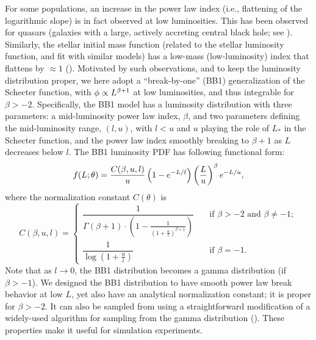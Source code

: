 For some populations, an increase in the power law index (i.e., flattening of the logarithmic slope) is in fact observed at low luminosities.
This has been observed for quasars (galaxies with a large, actively accreting central black hole; see \citealt{M+13-QuasarLumFunc}).
Similarly, the stellar initial mass function (related to the stellar luminosity function, and fit with similar models) has a low-mass (low-luminosity) index that flattens by $\approx 1$ (\citealt{K07-IMF-BPL}).
Motivated by such observations, and to keep the luminosity distribution proper, we here adopt a ``break-by-one'' (BB1) generalization of the Schecter function, with $\phi \propto L^{\beta+1}$ at low luminosities, and thus integrable for $\beta > -2$.
Specifically, the BB1 model has a luminosity distribution with three parameters: a mid-luminosity power law index, $\beta$, and two parameters defining the mid-luminosity range, $(l, u)$, with $l < u$ and  $u$ playing the role of $L_*$ in the Schecter function, and the power law index smoothly breaking to $\beta+1$ as $L$ decreases below $l$.
The BB1 luminosity PDF has following functional form:
\begin{equation}
\label{eq:lumPDF} 
f(L ; \theta) = 
  \frac{C(\beta,u,l)}{u}\left(1-e^{-L/l}\right) \left(\frac{L}{u}\right)^{\beta} e^{-L/u},
\end{equation}
where the normalization constant $C(\theta)$ is
\begin{equation}
\label{eq:normLumPDF} 
C(\beta,u,l) =
  \begin{cases} \dfrac{1}{\Gamma(\beta+1)\cdot\left(1-\frac{1}{\left(1+\frac{u}{l}\right)^{\beta+1}}\right)} 
    & \quad \text{if } \beta > -2\text{ and }\beta \ne -1; \\
 \dfrac{1}{\log\left(1+\frac{u}{l}\right)} & \quad \text{if } \beta=-1.
  \end{cases}
\end{equation} 
Note that as $l\rightarrow 0$, the BB1 distribution becomes a gamma distribution (if $\beta > -1$).
We designed the BB1 distribution to have smooth power law break behavior at low $L$, yet also have an analytical normalization constant;
it is proper for $\beta > -2$.
It can also be sampled from using a straightforward modification of a widely-used algorithm for sampling from the gamma distribution (\citealt{ahrens_computer_1974}).
These properties make it useful for simulation experiments.

